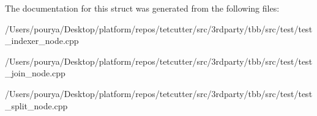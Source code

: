 The documentation for this struct was generated from the following files\+:\begin{DoxyCompactItemize}
\item 
/\+Users/pourya/\+Desktop/platform/repos/tetcutter/src/3rdparty/tbb/src/test/test\+\_\+indexer\+\_\+node.\+cpp\item 
/\+Users/pourya/\+Desktop/platform/repos/tetcutter/src/3rdparty/tbb/src/test/test\+\_\+join\+\_\+node.\+cpp\item 
/\+Users/pourya/\+Desktop/platform/repos/tetcutter/src/3rdparty/tbb/src/test/test\+\_\+split\+\_\+node.\+cpp\end{DoxyCompactItemize}
